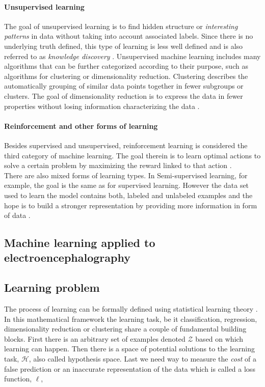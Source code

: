 \paragraph{Unsupervised learning}
The goal of unsupervised learning is to find hidden structure or \textit{interesting patterns} in data without taking into account associated labels. Since there is no underlying truth defined, this type of learning is less well defined and is also referred to as \textit{knowledge discovery} \cite{Murphy2012}. Unsupervised machine learning includes many algorithms that can be further categorized according to their purpose, such as algorithms for clustering or dimensionality reduction. Clustering describes the automatically grouping of similar data points together in fewer subgroups or clusters. The goal of dimensionality reduction is to express the data in fewer properties without losing information characterizing the data \cite{Cunningham2014}. 

\paragraph{Reinforcement and other forms of learning}
Besides supervised and unsupervised, reinforcement learning is considered the third category of machine learning. The goal therein is to learn optimal actions to solve a certain problem by maximizing the reward linked to that action \cite{Murphy2012}.\\
There are also mixed forms of learning types. In Semi-supervised learning, for example, the goal is the same as for supervised learning. However the data set used to learn the model contains both, labeled and unlabeled examples and the hope is to build a stronger representation by providing more information in form of data \cite{Burkov2019}.



\subsection{Machine learning applied to electroencephalography}
\subsection{Learning problem}
The process of learning can be formally defined using statistical learning theory \cite{Von_luxburg2011,Shalev2014}. In this mathematical framework the learning task, be it classification, regression, dimensionality reduction or clustering share a couple of fundamental building blocks. First there is an arbitrary set of examples denoted $\mathcal{Z}$ based on which learning can happen. Then there is a space of potential solutions to the learning task, $\mathcal{H}$,  also called hypothesis space. Last we need way to measure the \textit{cost} of a false prediction or an inaccurate representation of the data which is called a loss function, $\ell$,\\


